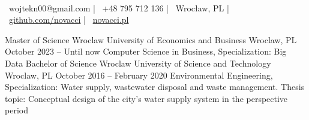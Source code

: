 \documentclass[]{awesome-cv}
\begin{document}
\begin{center}
	  \\
	\vspace{2mm}
	{\faEnvelope\ wojtekn00@gmail.com} | {\faMobile\ +48 795 712 136} | {\faMapMarker\ Wrocław, PL} | {\faLink\ \href{https://github.com/Novacci}{github.com/novacci}} | {\faGlobe\ \href{https://novacci.pl/}{novacci.pl}}
\end{center}
\begin{cventries}
	\cventry
	{Master of Science}
	{Wroclaw University of Economics and Business}
	{Wroclaw, PL}
	{October 2023 – Until now}
	{Computer Science in Business, Specialization: Big Data}
	\cventry
	{Bachelor of Science}
	{Wroclaw University of Science and Technology}
	{Wroclaw, PL}
	{October 2016 – February 2020}
	{Environmental Engineering, Specialization: Water supply, wastewater disposal and waste management. Thesis topic: Conceptual design of the city's water supply system in the perspective period}
\end{cventries}
\end{document}
